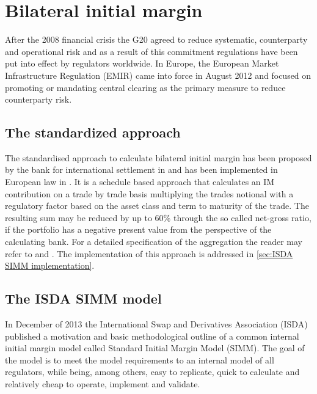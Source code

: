 \documentclass[../Thesis_AHoecherl.tex]{subfiles}
\begin{document}
    \section{Bilateral initial margin}\label{Bilateral initial margin}
    
    After the 2008 financial crisis the G20 agreed to reduce systematic, counterparty and operational risk and as a result of this commitment regulations have been put into effect by regulators worldwide. In Europe, the European Market Infrastructure Regulation (EMIR) came into force in August 2012 and focused on promoting or mandating central clearing as the primary measure to reduce counterparty risk.

    \subsection{The standardized approach}\label{The standard approach}

    The standardised approach to calculate bilateral initial margin has been proposed by the bank for international settlement in \cite[Requirement 3.5 and 3.6]{BCBS_MarginRequirements} and has been implemented in European law in \cite{OTC_Margin_EU_Regulation}. It is a schedule based approach that calculates an \gls{IM} contribution on a trade by trade basis multiplying the trades notional with a regulatory factor based on the asset class and term to maturity of the trade.
    The resulting sum may be reduced by up to 60\% through the so called net-gross ratio, if the portfolio has a negative present value from the perspective of the calculating bank.
    For a detailed specification of the aggregation the reader may refer to \cite{BCBS_MarginRequirements} and \cite{OTC_Margin_EU_Regulation}. The implementation of this approach is addressed in \ref{sec:ISDA SIMM implementation}.
    
    \subsection{The ISDA SIMM model}\label{sec:The ISDA-SIMM model}
    In December of 2013 the International Swap and Derivatives Association (ISDA) published a motivation and basic methodological outline of a common internal initial margin model called Standard Initial Margin Model (SIMM\texttrademark)\cite{ISDADec2013}. The goal of the model is to meet the model requirements to an internal model of all regulators, while being, among others, easy to replicate, quick to calculate and relatively cheap to operate, implement and validate.
\end{document}
